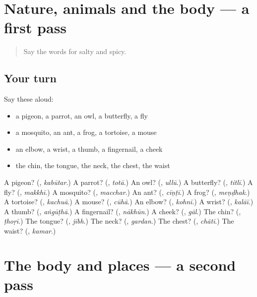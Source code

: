 \section[(dialogue)]{Nature, animals and the body — a first pass}

\label{lesson:HI-R156-first-pass-nature-animals-and-the-body}



\begin{quote}
Say the words for salty and spicy.
\end{quote}

\subsection*{Your turn}
Say these aloud:

\begin{itemize}
\raggedright
  \item a pigeon, a parrot, an owl, a butterfly, a fly
  \item a mosquito, an ant, a frog, a tortoise, a mouse
  \item an elbow, a wrist, a thumb, a fingernail, a cheek
  \item the chin, the tongue, the neck, the chest, the waist
\end{itemize}

\begin{tcolorbox}[breakable,colback=teal!4,colframe=teal!35!black,title={Before you move on}]
A pigeon? (\textbf{}, \emph{kabūtar}.) A parrot? (\textbf{}, \emph{totā}.) An owl? (\textbf{}, \emph{ullū}.) A butterfly? (\textbf{}, \emph{titlī}.) A fly? (\textbf{}, \emph{makkhī}.) A mosquito? (\textbf{}, \emph{macchar}.) An ant? (\textbf{}, \emph{cīṇṭī}.) A frog? (\textbf{}, \emph{meṇḍhak}.) A tortoise? (\textbf{}, \emph{kachuā}.) A mouse? (\textbf{}, \emph{cūhā}.) An elbow? (\textbf{}, \emph{kohnī}.) A wrist? (\textbf{}, \emph{kalāī}.) A thumb? (\textbf{}, \emph{aṅgūṭhā}.) A fingernail? (\textbf{}, \emph{nākhūn}.) A cheek? (\textbf{}, \emph{gāl}.) The chin? (\textbf{}, \emph{ṭhoṛī}.) The tongue? (\textbf{}, \emph{jībh}.) The neck? (\textbf{}, \emph{gardan}.) The chest? (\textbf{}, \emph{chātī}.) The waist? (\textbf{}, \emph{kamar}.)
\end{tcolorbox}
\section[(dialogue)]{The body and places — a second pass}

